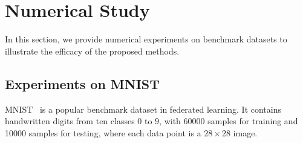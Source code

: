 \documentclass[sigconf, anonymous, review]{acmart}
\begin{document}

 






\section{Numerical Study}\label{sec:experiment}

In this section, we provide numerical experiments on benchmark datasets to illustrate the efficacy of the proposed methods.

\subsection{Experiments on MNIST}

MNIST~\cite{mnist} is a popular benchmark dataset in federated learning. It contains handwritten digits from ten classes $0$ to $9$, with 60000 samples for training and 10000 samples for testing, where each data point is a $28\times 28$ image.
\end{document}
